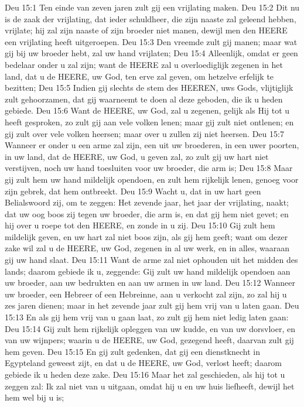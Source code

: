 Deu 15:1  Ten einde van zeven jaren zult gij een vrijlating maken.
Deu 15:2  Dit nu is de zaak der vrijlating, dat ieder schuldheer, die zijn naaste zal geleend hebben, vrijlate; hij zal zijn naaste of zijn broeder niet manen, dewijl men den HEERE een vrijlating heeft uitgeroepen.
Deu 15:3  Den vreemde zult gij manen; maar wat gij bij uw broeder hebt, zal uw hand vrijlaten;
Deu 15:4  Alleenlijk, omdat er geen bedelaar onder u zal zijn; want de HEERE zal u overloediglijk zegenen in het land, dat u de HEERE, uw God, ten erve zal geven, om hetzelve erfelijk te bezitten;
Deu 15:5  Indien gij slechts de stem des HEEREN, uws Gods, vlijtiglijk zult gehoorzamen, dat gij waarneemt te doen al deze geboden, die ik u heden gebiede.
Deu 15:6  Want de HEERE, uw God, zal u zegenen, gelijk als Hij tot u heeft gesproken, zo zult gij aan vele volken lenen; maar gij zult niet ontlenen; en gij zult over vele volken heersen; maar over u zullen zij niet heersen.
Deu 15:7  Wanneer er onder u een arme zal zijn, een uit uw broederen, in een uwer poorten, in uw land, dat de HEERE, uw God, u geven zal, zo zult gij uw hart niet verstijven, noch uw hand toesluiten voor uw broeder, die arm is;
Deu 15:8  Maar gij zult hem uw hand mildelijk opendoen, en zult hem rijkelijk lenen, genoeg voor zijn gebrek, dat hem ontbreekt.
Deu 15:9  Wacht u, dat in uw hart geen Belialswoord zij, om te zeggen: Het zevende jaar, het jaar der vrijlating, naakt; dat uw oog boos zij tegen uw broeder, die arm is, en dat gij hem niet gevet; en hij over u roepe tot den HEERE, en zonde in u zij.
Deu 15:10  Gij zult hem mildelijk geven, en uw hart zal niet boos zijn, als gij hem geeft; want om dezer zake wil zal u de HEERE, uw God, zegenen in al uw werk, en in alles, waaraan gij uw hand slaat.
Deu 15:11  Want de arme zal niet ophouden uit het midden des lands; daarom gebiede ik u, zeggende: Gij zult uw hand mildelijk opendoen aan uw broeder, aan uw bedrukten en aan uw armen in uw land.
Deu 15:12  Wanneer uw broeder, een Hebreer of een Hebreinne, aan u verkocht zal zijn, zo zal hij u zes jaren dienen; maar in het zevende jaar zult gij hem vrij van u laten gaan.
Deu 15:13  En als gij hem vrij van u gaan laat, zo zult gij hem niet ledig laten gaan:
Deu 15:14  Gij zult hem rijkelijk opleggen van uw kudde, en van uw dorsvloer, en van uw wijnpers; waarin u de HEERE, uw God, gezegend heeft, daarvan zult gij hem geven.
Deu 15:15  En gij zult gedenken, dat gij een dienstknecht in Egypteland geweest zijt, en dat u de HEERE, uw God, verlost heeft; daarom gebiede ik u heden deze zake.
Deu 15:16  Maar het zal geschieden, als hij tot u zeggen zal: Ik zal niet van u uitgaan, omdat hij u en uw huis liefheeft, dewijl het hem wel bij u is;
